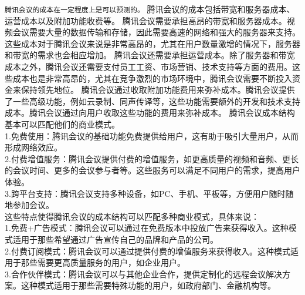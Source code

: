 \documentclass[a4paper,12pt]{article}
\begin{document}
\texttt{腾讯会议的成本在一定程度上是可以预测的。}
腾讯会议的成本包括带宽和服务器成本、运营成本以及附加功能收费等。
腾讯会议需要承担高昂的带宽和服务器成本。视频会议需要大量的数据传输和存储，因此需要高速的网络和强大的服务器来支持。这些成本对于腾讯会议来说是非常高昂的，尤其在用户数量激增的情况下，服务器和带宽的需求也会相应增加。
腾讯会议还需要承担运营成本。除了服务器和带宽成本之外，腾讯会议还需要支付员工工资、市场营销、技术支持等方面的费用。这些成本也是非常高昂的，尤其在竞争激烈的市场环境中，腾讯会议需要不断投入资金来保持领先地位。
腾讯会议通过收取附加功能费用来弥补成本。腾讯会议提供了一些高级功能，例如云录制、同声传译等，这些功能需要额外的开发和技术支持成本。腾讯会议通过向用户收取这些功能的费用来弥补成本。
腾讯会议成本结构基本可以匹配他们的商业模式。\\
1.免费使用：腾讯会议的基础功能免费提供给用户，这有助于吸引大量用户，从而形成网络效应。\\
2.付费增值服务：腾讯会议提供付费的增值服务，如更高质量的视频和音频、更长的会议时间、更多的会议参与者等。这些服务可以满足不同用户的需求，提高用户体验。\\
3.跨平台支持：腾讯会议支持多种设备，如PC、手机、平板等，方便用户随时随地参加会议。\\
这些特点使得腾讯会议的成本结构可以匹配多种商业模式，具体来说：\\
1.免费+广告模式：腾讯会议可以通过在免费版本中投放广告来获得收入。这种模式适用于那些希望通过广告宣传自己的品牌和产品的公司。\\
2.付费订阅模式：腾讯会议可以通过提供付费的增值服务来获得收入。这种模式适用于那些需要更高质量服务的用户，如企业用户。\\
3.合作伙伴模式：腾讯会议可以与其他企业合作，提供定制化的远程会议解决方案。这种模式适用于那些需要特殊功能的用户，如政府部门、金融机构等。\\
\end{document}
